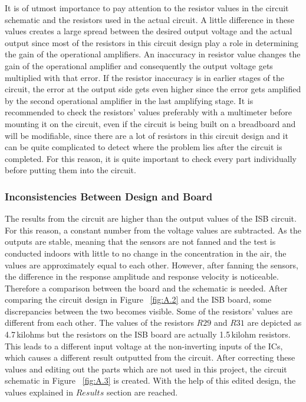 It is of utmost importance to pay attention to the resistor values in the circuit schematic and the resistors used in the actual circuit. A little difference in these values creates a large spread between the desired output voltage and the actual output since most of the resistors in this circuit design play a role in determining the gain of the operational amplifiers. An inaccuracy in resistor value changes the gain of the operational amplifier and consequently the output voltage gets multiplied with that error. If the resistor inaccuracy is in earlier stages of the circuit, the error at the output side gets even higher since the error gets amplified by the second operational amplifier in the last amplifying stage. It is recommended to check the resistors' values preferably with a multimeter before mounting it on the circuit, even if the circuit is being built on a breadboard and will be modifiable, since there are a lot of resistors in this circuit design and it can be quite complicated to detect where the problem lies after the circuit is completed. For this reason, it is quite important to check every part individually before putting them into the circuit. \par 

\subsubsection{Inconsistencies Between Design and Board}
The results from the circuit are higher than the output values of the ISB circuit. For this reason, a constant number from the voltage values are subtracted. As the outputs are stable, meaning that the sensors are not fanned and the test is conducted indoors with little to no change in the  concentration in the air, the values are approximately equal to each other. However, after fanning the sensors, the difference in the response amplitude and response velocity is noticeable. Therefore a comparison between the board and the schematic is needed. After comparing the circuit design in Figure  ~\ref{fig:A.2} and the ISB board, some discrepancies between the two becomes visible. Some of the resistors' values are different from each other. The values of the resistors $R29$ and $R31$ are depicted as 4.7\,kilohms but the resistors on the ISB board are actually 1.5\,kilohm resistors. This leads to a different input voltage at the non-inverting inputs of the ICs, which causes a different result outputted from the circuit. After correcting these values and editing out the parts which are not used in this project, the circuit schematic in Figure  ~\ref{fig:A.3} is created. With the help of this edited design, the values explained in $Results$ section are reached.